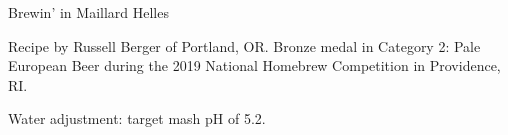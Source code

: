 \stylesection{\stylemunichhelles}

\begin{recipe}{Brewin' in Maillard Helles} %

\begin{aboutblock}
Recipe by Russell Berger of Portland, OR. Bronze medal in Category 2: Pale
European Beer during the 2019 National Homebrew Competition in Providence, RI.
\sourceaha
\end{aboutblock}


\begin{methodandtiming}
 
\begin{mashsteps}
\end{mashsteps}

\begin{fermentationsteps}
\end{fermentationsteps}

\begin{directions}
Water adjustment: target mash pH of 5.2.
\end{directions}

\end{methodandtiming}

\recipebreak

\begin{ingredientsblock}

\begin{malts}
\end{malts}

\begin{hops}
\end{hops}


\end{ingredientsblock}

\end{recipe}

